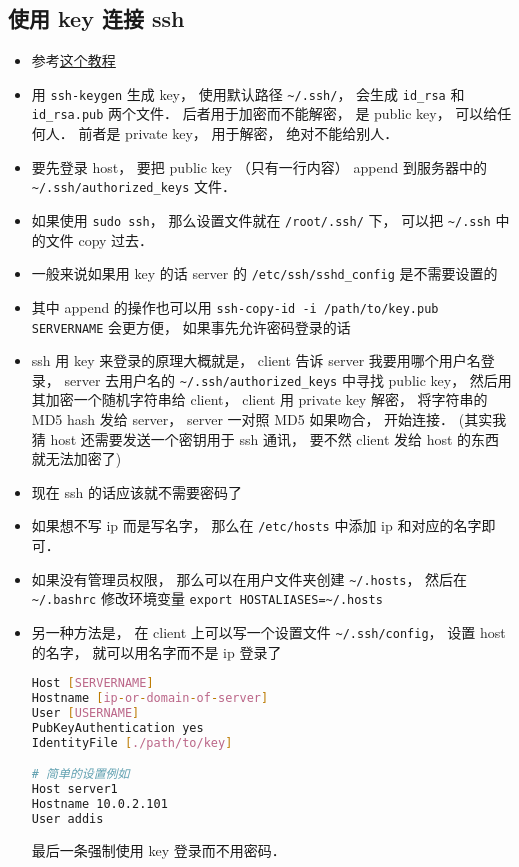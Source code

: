 \subsection{使用 key 连接 ssh}
\begin{itemize}
\item 参考\href{https://www.digitalocean.com/community/tutorials/ssh-essentials-working-with-ssh-servers-clients-and-keys}{这个教程}
\item 用 \verb`ssh-keygen` 生成 key， 使用默认路径 \verb`~/.ssh/`， 会生成 \verb`id_rsa` 和 \verb`id_rsa.pub` 两个文件． 后者用于加密而不能解密， 是 public key， 可以给任何人． 前者是 private key， 用于解密， 绝对不能给别人．
\item 要先登录 host， 要把 public key （只有一行内容） append 到服务器中的 \verb`~/.ssh/authorized_keys` 文件．
\item 如果使用 \verb|sudo ssh|， 那么设置文件就在 \verb|/root/.ssh/| 下， 可以把 \verb|~/.ssh| 中的文件 copy 过去．
\item 一般来说如果用 key 的话 server 的 \verb`/etc/ssh/sshd_config` 是不需要设置的
\item 其中 append 的操作也可以用 \verb`ssh-copy-id -i /path/to/key.pub SERVERNAME` 会更方便， 如果事先允许密码登录的话
\item ssh 用 key 来登录的原理大概就是， client 告诉 server 我要用哪个用户名登录， server 去用户名的 \verb`~/.ssh/authorized_keys` 中寻找 public key， 然后用其加密一个随机字符串给 client， client 用 private key 解密， 将字符串的 MD5 hash 发给 server， server 一对照 MD5 如果吻合， 开始连接．  (其实我猜 host 还需要发送一个密钥用于 ssh 通讯， 要不然 client 发给 host 的东西就无法加密了)
\item 现在 ssh 的话应该就不需要密码了
\item 如果想不写 ip 而是写名字， 那么在 \verb|/etc/hosts| 中添加 ip 和对应的名字即可．
\item 如果没有管理员权限， 那么可以在用户文件夹创建 \verb|~/.hosts|， 然后在 \verb|~/.bashrc| 修改环境变量 \verb|export HOSTALIASES=~/.hosts|
\item 另一种方法是， 在 client 上可以写一个设置文件 \verb`~/.ssh/config`， 设置 host 的名字， 就可以用名字而不是 ip 登录了
\begin{lstlisting}[language=bash]
Host [SERVERNAME]
Hostname [ip-or-domain-of-server]
User [USERNAME]
PubKeyAuthentication yes
IdentityFile [./path/to/key]

# 简单的设置例如
Host server1
Hostname 10.0.2.101
User addis
\end{lstlisting}
最后一条强制使用 key 登录而不用密码．


\end{itemize}
